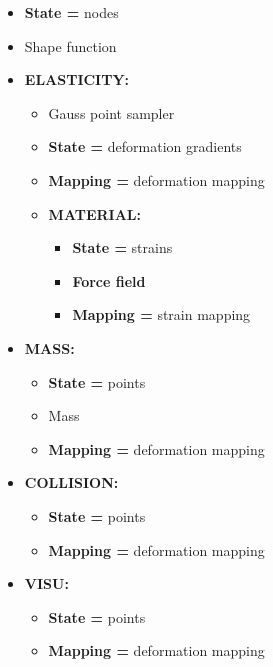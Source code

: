 \begin{itemize}
 \item \textbf{State =} nodes
 \item Shape function

 \item \textbf{ELASTICITY:}
  \begin{itemize}
  \item Gauss point sampler
  \item \textbf{State =} deformation gradients
  \item \textbf{Mapping =} deformation mapping

  \item \textbf{MATERIAL:}
    \begin{itemize}
    \item \textbf{State =} strains
    \item \textbf{Force field}
    \item \textbf{Mapping =} strain mapping
    \end{itemize}
  \end{itemize}

 \item \textbf{MASS:}
    \begin{itemize}
    \item \textbf{State =} points 
    \item Mass
    \item \textbf{Mapping =} deformation mapping
    \end{itemize}
 \item \textbf{COLLISION:}
    \begin{itemize}
    \item \textbf{State =} points 
    \item \textbf{Mapping =} deformation mapping
    \end{itemize}
 \item \textbf{VISU:}
    \begin{itemize}
    \item \textbf{State =} points 
    \item \textbf{Mapping =} deformation mapping
    \end{itemize}

\end{itemize}




